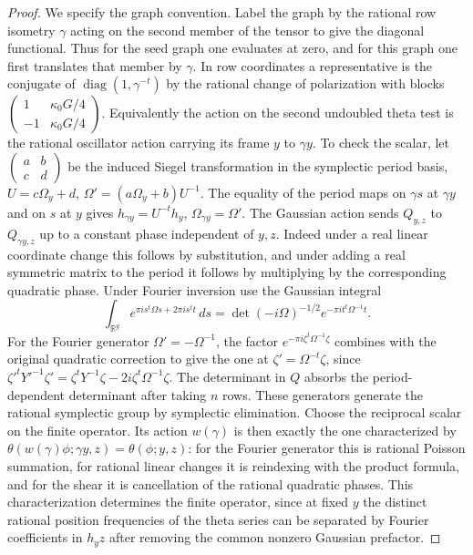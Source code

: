 \begin{proof}
We specify the graph convention. Label the graph by the rational
row isometry $\gamma$ acting on the second member of the tensor to
give the diagonal functional. Thus for the seed graph one evaluates
at zero, and for this graph one first translates that member by
$\gamma$. In row coordinates a representative is the conjugate of
$\operatorname{diag}(1,\gamma^{-t})$ by the rational change of
polarization with blocks
$\left(\begin{smallmatrix}1&\kappa_0G/4\\-1&\kappa_0G/4\end{smallmatrix}\right)$.
Equivalently the action on the second undoubled theta test is the
rational oscillator action carrying its frame $y$ to $\gamma y$.
To check the scalar, let
$\left(\begin{smallmatrix}a&b\\c&d\end{smallmatrix}\right)$ be
the induced Siegel transformation in the symplectic period basis,
$U=c\Omega_y+d$, $\Omega'=(a\Omega_y+b)U^{-1}$.
The equality of the period maps on $\gamma s$ at $\gamma y$ and on
$s$ at $y$ gives $h_{\gamma y}=U^{-t}h_y$,
$\Omega_{\gamma y}=\Omega'$. The Gaussian action sends
$Q_{y,z}$ to $Q_{\gamma y,z}$ up to a constant phase independent
of $y,z$. Indeed under a real linear coordinate change this follows
by substitution, and under adding a real symmetric matrix to the
period it follows by multiplying by the corresponding quadratic
phase. Under Fourier inversion use the Gaussian integral
\[
 \int_{\mathbb R^g}e^{\pi i s^t\Omega s+2\pi i s^t t}\,ds
       =\det(-i\Omega)^{-1/2}e^{-\pi i t^t\Omega^{-1}t}.
\]
For the Fourier generator $\Omega'=-\Omega^{-1}$, the factor
$e^{-\pi i\zeta^t\Omega^{-1}\zeta}$ combines with the original
quadratic correction to give the one at
$\zeta'=\Omega^{-t}\zeta$, since
$\zeta'^tY'^{-1}\zeta'=\zeta^tY^{-1}\zeta-
2i\zeta^t\Omega^{-1}\zeta$. The determinant in $Q$ absorbs the
period-dependent determinant after taking $n$ rows. These generators
generate the rational symplectic group by symplectic elimination.
Choose the reciprocal scalar on the finite operator. Its action
$w(\gamma)$ is then exactly the one characterized by
$\theta(w(\gamma)\phi;\gamma y,z)=\theta(\phi;y,z)$: for the
Fourier generator this is rational Poisson summation, for rational
linear changes it is reindexing with the product formula, and for
the shear it is cancellation of the rational quadratic phases.
This characterization determines the finite operator, since at
fixed $y$ the distinct rational position frequencies of the theta
series can be separated by Fourier coefficients in $h_yz$ after
removing the common nonzero Gaussian prefactor.


\end{proof}

